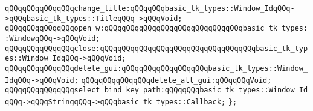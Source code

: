 \verb|qQQqqQQqqQQqqQQqchange_title:qQQqqQQqbasic_tk_types::Window_IdqQQq->qQQqbasic_tk_types::TitleqQQq->qQQqVoid;|\newline
\verb|qQQqqQQqqQQqqQQqopen_w:qQQqqQQqqQQqqQQqqQQqqQQqqQQqqQQqbasic_tk_types::WindowqQQq->qQQqVoid;|\newline
\verb|qQQqqQQqqQQqqQQqclose:qQQqqQQqqQQqqQQqqQQqqQQqqQQqqQQqqQQqbasic_tk_types::Window_IdqQQq->qQQqVoid;|\newline
\newline
\verb|qQQqqQQqqQQqqQQqdelete_gui:qQQqqQQqqQQqqQQqqQQqbasic_tk_types::Window_IdqQQq->qQQqVoid;|\newline
\verb|qQQqqQQqqQQqqQQqdelete_all_gui:qQQqqQQqVoid;|\newline
\newline
\verb|qQQqqQQqqQQqqQQqselect_bind_key_path:qQQqqQQqbasic_tk_types::Window_IdqQQq->qQQqStringqQQq->qQQqbasic_tk_types::Callback;|\newline
\newline
\verb|};|\newline

